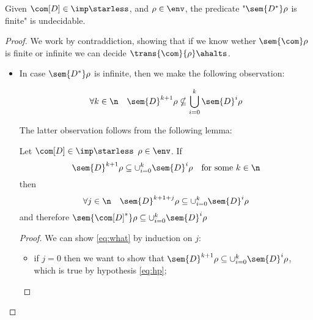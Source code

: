 \begin{lemma}\label{le:infiniteness}
  Given \(\com[D]\in\imp\starless\), and \(\rho \in \env\), the
  predicate "\(\sem{D^*}\rho\) is finite" is undecidable.
\end{lemma}

\begin{proof}
  We work by contraddiction, showing that if we know wether
  \(\sem{\com}\rho\) is finite or infinite we can decide
  \(\trans{\com}{\rho}\ahalts\).
  \begin{itemize}
  \item In case \(\sem{D^*}\rho\) is infinite, then we make the
    following observation:

    \begin{observation}\label{obs:noncontained}
      \begin{equation*}
        \forall k \in \n \quad \sem{D}^{k+1}\rho \nsubseteq \bigcup_{i=0}^k\sem{D}^i\rho
      \end{equation*} 
    \end{observation}
    The latter observation follows from the following lemma:
    \begin{lemma}\label{le:contain}
      Let \(\com[D] \in \imp\starless\) \(\rho \in \env\). If
      \begin{equation}\label{eq:hp}
        \sem{D}^{k+1}\rho \subseteq \cup_{i=0}^k\sem{D}^i\rho \quad \text{for some } k \in \n
      \end{equation}
      then
      \begin{equation}\label{eq:what}
        \forall j \in \n \quad \sem{D}^{k+1+j}\rho \subseteq \cup_{i=0}^k\sem{D}^i\rho
      \end{equation}
      and therefore
      \(\sem{\com[D]^*}\rho \subseteq \cup_{i=0}^k\sem{D}^i\rho\)
    \end{lemma}
    \begin{proof}
      We can show \eqref{eq:what} by induction on \(j\):
      \begin{itemize}
      \item if \(j=0\) then we want to show that
        \(\sem{D}^{k+1}\rho \subseteq \cup_{i=0}^k\sem{D}^i\rho\), which is
        true by hypothesis \eqref{eq:hp};
        

\end{itemize}
\end{proof}
\end{itemize}
\end{proof}
